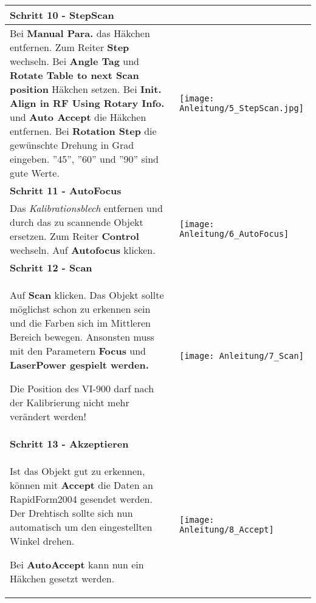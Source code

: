 \begin{longtable}{|>{\RaggedRight}m{5cm}|m{8cm}|}
\multicolumn{2}{|l|}%
{{\textbf{Schritt 10 - StepScan}}}
\\ \hline
Bei \textbf{Manual Para.} das Häkchen entfernen.\linebreak
Zum Reiter \textbf{Step} wechseln.\linebreak
Bei \textbf{Angle Tag} und \textbf{Rotate Table to next Scan position} Häkchen setzen.\linebreak
Bei \textbf{Init. Align in RF Using Rotary Info.} und \textbf{Auto Accept} die Häkchen entfernen.\linebreak
Bei \textbf{Rotation Step} die gewünschte Drehung in Grad eingeben. \linebreak
''45'', ''60'' und ''90'' sind gute Werte.
& 
\texttt{[image: Anleitung/5\_StepScan.jpg]}
\\ \hline  

\multicolumn{2}{|l|}%
{{\textbf{Schritt 11 - AutoFocus}}}
\\ \hline
Das \emph{Kalibrationsblech} entfernen und durch das zu scannende Objekt ersetzen.\linebreak
Zum Reiter \textbf{Control} wechseln. \linebreak
Auf \textbf{Autofocus} klicken.\linebreak
& 
\texttt{[image: Anleitung/6\_AutoFocus]}
\\ \hline  

\multicolumn{2}{|l|}%
{{\textbf{Schritt 12 - Scan}}}
\\ \hline
Auf \textbf{Scan} klicken. \linebreak
Das Objekt sollte möglichst schon zu erkennen sein und die Farben sich im Mittleren Bereich bewegen. \linebreak
Ansonsten muss mit den Parametern \textbf{Focus} und \textbf{LaserPower gespielt werden.}
\begin{TippS}Die Position des VI-900 darf nach der Kalibrierung nicht mehr verändert werden!\end{TippS}
& 
\texttt{[image: Anleitung/7\_Scan]}
\\ \hline  

\multicolumn{2}{|l|}%
{{\textbf{Schritt 13 - Akzeptieren}}}
\\ \hline
Ist das Objekt gut zu erkennen, können mit \textbf{Accept} die Daten an RapidForm2004 gesendet werden. Der Drehtisch sollte sich nun automatisch um den eingestellten Winkel drehen. 
\begin{TippS}Bei \textbf{AutoAccept} kann nun ein Häkchen gesetzt werden.\end{TippS}
& 
\texttt{[image: Anleitung/8\_Accept]}
\\ \hline  


\end{longtable}
